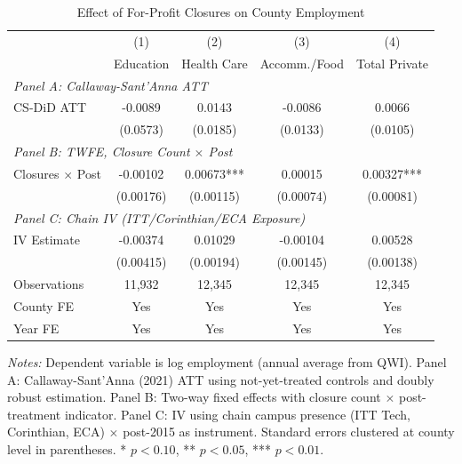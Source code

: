 \begin{table}[htbp]
\centering
\caption{Effect of For-Profit Closures on County Employment}
\label{tab:main}
\begin{tabular}{lcccc}
\hline\hline
 & (1) & (2) & (3) & (4) \\
 & Education & Health Care & Accomm./Food & Total Private \\
\hline
\multicolumn{5}{l}{\textit{Panel A: Callaway-Sant'Anna ATT}} \\[3pt]
CS-DiD ATT & -0.0089 & 0.0143 & -0.0086 & 0.0066 \\
 & (0.0573) & (0.0185) & (0.0133) & (0.0105) \\[6pt]
\multicolumn{5}{l}{\textit{Panel B: TWFE, Closure Count $\times$ Post}} \\[3pt]
Closures $\times$ Post & -0.00102 & 0.00673*** & 0.00015 & 0.00327*** \\
 & (0.00176) & (0.00115) & (0.00074) & (0.00081) \\[6pt]
\multicolumn{5}{l}{\textit{Panel C: Chain IV (ITT/Corinthian/ECA Exposure)}} \\[3pt]
IV Estimate & -0.00374 & 0.01029 & -0.00104 & 0.00528 \\
 & (0.00415) & (0.00194) & (0.00145) & (0.00138) \\
\hline
Observations & 11,932 & 12,345 & 12,345 & 12,345 \\
County FE & Yes & Yes & Yes & Yes \\
Year FE & Yes & Yes & Yes & Yes \\
\hline\hline
\end{tabular}
\begin{tablenotes}[flushleft]\small
\item \textit{Notes:} Dependent variable is log employment (annual average from QWI).
Panel A: Callaway-Sant'Anna (2021) ATT using not-yet-treated controls and doubly robust estimation.
Panel B: Two-way fixed effects with closure count $\times$ post-treatment indicator.
Panel C: IV using chain campus presence (ITT Tech, Corinthian, ECA) $\times$ post-2015 as instrument.
Standard errors clustered at county level in parentheses.
* $p<0.10$, ** $p<0.05$, *** $p<0.01$.
\end{tablenotes}
\end{table}
